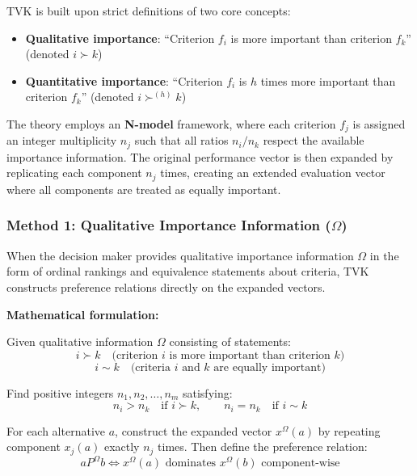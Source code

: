 \documentclass[conference]{IEEEtran}
\begin{document}
TVK is built upon strict definitions of two core concepts:
\begin{itemize}
	\item \textbf{Qualitative importance}: ``Criterion $f_i$ is more important than criterion $f_k$'' (denoted $i \succ k$)
	\item \textbf{Quantitative importance}: ``Criterion $f_i$ is $h$ times more important than criterion $f_k$'' (denoted $i \succ^{(h)} k$)
\end{itemize}

The theory employs an \textbf{N-model} framework, where each criterion $f_j$ is assigned an integer multiplicity $n_j$ such that all ratios $n_i/n_k$ respect the available importance information. The original performance vector is then expanded by replicating each component $n_j$ times, creating an extended evaluation vector where all components are treated as equally important.

\subsubsection{Method 1: Qualitative Importance Information ($\Omega$)}

When the decision maker provides qualitative importance information $\Omega$ in the form of ordinal rankings and equivalence statements about criteria, TVK constructs preference relations directly on the expanded vectors.

\textbf{Mathematical formulation:}

Given qualitative information $\Omega$ consisting of statements:
\begin{equation}
	i \succ k \quad \text{(criterion $i$ is more important than criterion $k$)}
\end{equation}
\begin{equation}
	i \sim k \quad \text{(criteria $i$ and $k$ are equally important)}
\end{equation}

Find positive integers $n_1, n_2, \ldots, n_m$ satisfying:
\begin{equation}
	n_i > n_k \quad \text{if } i \succ k, \qquad n_i = n_k \quad \text{if } i \sim k
\end{equation}

For each alternative $a$, construct the expanded vector $x^\Omega(a)$ by repeating component $x_j(a)$ exactly $n_j$ times. Then define the preference relation:
\begin{equation}
	a P^\Omega b \iff x^\Omega(a) \text{ dominates } x^\Omega(b) \text{ component-wise}
\end{equation}
\end{document}
